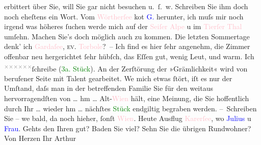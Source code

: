                erbittert über Sie, will Sie gar nicht besuchen u. ſ. w. Schreiben Sie ihm doch noch
               eheſtens ein Wort. Vom \textcolor{pink}{Wörtherſee}{}\ledrightnote{\textcolor{pink}{Wörthersee}} ko{\geminationm}t \textcolor{blue}{G.}{}\ledrightnote{\textcolor{blue}{Paul Goldmann}} herunter, ich
               muſs mir noch irgend was höheres ſuchen {\pb}werde mich
               auf der \textcolor{pink}{Seiſer Alpe}{}\ledrightnote{\textcolor{pink}{Seiser Alm}} u im \textcolor{pink}{Tierſer Thal}{}\ledrightnote{\textcolor{pink}{Tiers}} umſehn. Machen Sie’s doch möglich auch zu kommen.
               Die letzten Sommertage denk’ ich \textcolor{pink}{Gardaſee}{}\ledrightnote{\textcolor{pink}{Lago di Garda}}, \textsc{ev}. \textcolor{pink}{Torbole}{}\ledrightnote{\textcolor{pink}{Torbole sul Garda}}? –\pend
           \pstart
           Ich find es hier ſehr angenehm, die Zimmer offenbar neu hergerichtet ſehr hübſch, das
               Eſſen gut, wenig Leut, und warm. Ich \substVorne{}\textsuperscript{\textcolor{gray}{×}\-\textcolor{gray}{×}\-\textcolor{gray}{×}\-\textcolor{gray}{×}\-\textcolor{gray}{×}\-\textcolor{gray}{×}}\substDazwischen{}ſchreibe\substHinten{} (\textcolor{green}{3a. Stück}{}). An
               der Zerſtörung der »Grämlichkeit« wird von berufener Seite mit Talent gearbeitet.
                  We{\geminationn} mich etwas ſtört, iſt es nur der Um{\pb}ſtand, daſs man in der betreffenden Familie Sie für
               den weitaus hervorragendſten von {\dots} hm {\dots} Alt-\textcolor{pink}{Wien}{}\ledrightnote{\textcolor{pink}{Wien}} hält, eine Meinung, die Sie
               hoffentlich durch Ihr {\dots} wieder hm {\dots} nächſtes \textcolor{green}{Stück}{}
               endgiltig begraben werden.\pend
           \pstart
           – Schreiben Sie \introOben{}– we{\geminationn}\introOben{} bald, da{\geminationn} noch hieher, ſonſt \textcolor{pink}{Wien}{}\ledrightnote{\textcolor{pink}{Wien}}.\pend
           \pstart
           Heute Ausflug \textcolor{pink}{Karerſee}{}\ledrightnote{\textcolor{pink}{Karersee}}, wo \textcolor{blue}{Julius}{}\ledrightnote{\textcolor{blue}{Julius Schnitzler}} u \textcolor{blue}{Frau}{}.\pend
           \pstart
           Gehts den Ihren gut? Baden Sie viel? Sehn Sie die übrigen Rundwohner?\pend
           \pstart Von Herzen Ihr \spacefill\mbox{Arthur}\pend{}\endnumbering{}  
      